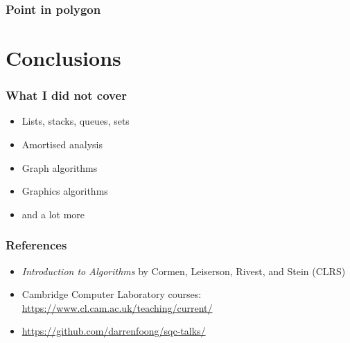 \documentclass{beamer}
\begin{document}
\begin{frame}
 \frametitle{Point in polygon}
\end{frame}

\section{Conclusions}

\begin{frame}
 \frametitle{What I did not cover}
 \begin{itemize}
  \item Lists, stacks, queues, sets
  \item Amortised analysis
  \item Graph algorithms
  \item Graphics algorithms
  \item and a lot more
 \end{itemize}
\end{frame}

\begin{frame}
 \frametitle{References}
 \begin{itemize}
  \item \emph{Introduction to Algorithms} by Cormen, Leiserson, Rivest, and Stein (CLRS)
  \item Cambridge Computer Laboratory courses: \url{https://www.cl.cam.ac.uk/teaching/current/}
  \item \url{https://github.com/darrenfoong/sqc-talks/}
 \end{itemize}
\end{frame}
\end{document}
